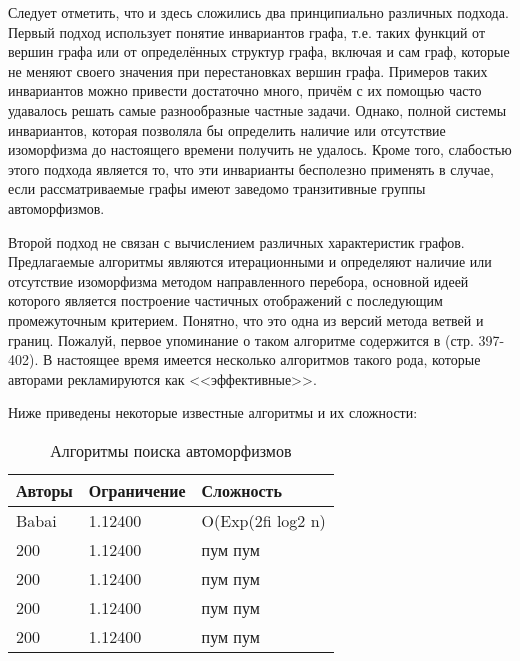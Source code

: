 Следует отметить, что и здесь сложились два принципиально различных подхода. Первый подход использует понятие инвариантов графа, т.е. таких функций от вершин графа или от определённых структур графа, включая и сам граф, которые не меняют своего значения при перестановках вершин графа. Примеров таких инвариантов можно привести достаточно много, причём с их помощью часто удавалось решать самые разнообразные частные задачи. Однако, полной системы инвариантов, которая позволяла бы определить наличие или отсутствие изоморфизма до настоящего времени получить не удалось. Кроме того, слабостью этого подхода является то, что эти инварианты бесполезно применять в случае, если рассматриваемые графы имеют заведомо транзитивные группы автоморфизмов.

Второй подход не связан с вычислением различных характеристик графов. Предлагаемые алгоритмы являются итерационными и определяют наличие или отсутствие изоморфизма методом направленного перебора, основной идеей которого является построение частичных отображений с последующим промежуточным критерием. Понятно, что это одна из версий метода ветвей и границ. Пожалуй, первое упоминание о таком алгоритме содержится в \cite{Reingold} (стр. 397-402). В настоящее время имеется несколько алгоритмов такого рода, которые авторами рекламируются как <<эффективные>>.

Ниже приведены некоторые известные алгоритмы и их сложности:

\begin{table}[h]
\centering
\begin{tabular}[t]{|l|l|l|}
\hline
\textbf{Авторы} & \textbf{Ограничение} & \textbf{Сложность}\\
\hline
Babai \cite{Babai}& 1.12400 & O(Exp(2fi log2 n)\\
\hline
200 & 1.12400 & пум пум\\
\hline
200 & 1.12400 & пум пум\\
\hline
200 & 1.12400 & пум пум\\
\hline
200 & 1.12400 & пум пум\\
\hline
\end{tabular}
\caption{Алгоритмы поиска автоморфизмов}
\label{tabular:algos}
\end{table}

